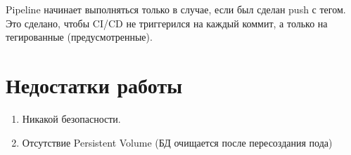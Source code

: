 Pipeline начинает выполняться только в случае, если был сделан push с тегом. Это сделано, чтобы CI/CD не триггерился на каждый коммит, а только на тегированные (предусмотренные).

\section{Недостатки работы}
\begin{enumerate}
    \item Никакой безопасности.
    \item Отсутствие Persistent Volume (БД очищается после пересоздания пода)
\end{enumerate}
\endinput